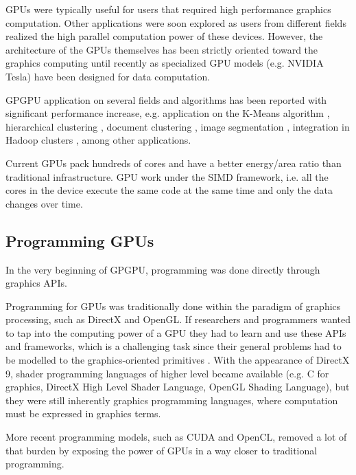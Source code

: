 GPUs were typically useful for users that required high performance graphics computation. Other applications were soon explored as users from different fields realized the high parallel computation power of these devices. However, the architecture of the GPUs themselves has been strictly oriented toward the graphics computing until recently as specialized GPU models (e.g. NVIDIA Tesla) have been designed for data computation.

GPGPU application on several fields and algorithms has been reported with significant performance increase, e.g. application on the K-Means algorithm \cite{Bai2009,Wu2011,Zechner2009,Wu2009a}, hierarchical clustering \cite{Shalom2009,ArulShalom2011}, document clustering \cite{gao20xx}, image segmentation \cite{Sirotkovi2012}, integration in Hadoop clusters \cite{Malakar2013,Grossman2013}, among other applications.

Current GPUs pack hundreds of cores and have a better energy/area ratio than traditional infrastructure.
GPU work under the SIMD framework, i.e. all the cores in the device execute the same code at the same time and only the data changes over time.

\subsection{Programming GPUs}

In the very beginning of GPGPU, programming was done directly through graphics APIs. 

Programming for GPUs was traditionally done within the paradigm of graphics processing, such as DirectX and OpenGL. If researchers and programmers wanted to tap into the computing power of a GPU they had to learn and use these APIs and frameworks, which is a challenging task since their general problems had to be modelled to the graphics-oriented primitives \cite{Misi2012}. With the appearance of DirectX 9, shader programming languages of higher level became available (e.g. C for graphics, DirectX High Level Shader Language, OpenGL Shading Language), but they were still inherently graphics programming languages, where computation must be expressed in graphics terms. 

More recent programming models, such as CUDA and OpenCL, removed a lot of that burden by exposing the power of GPUs in a way closer to traditional programming.

